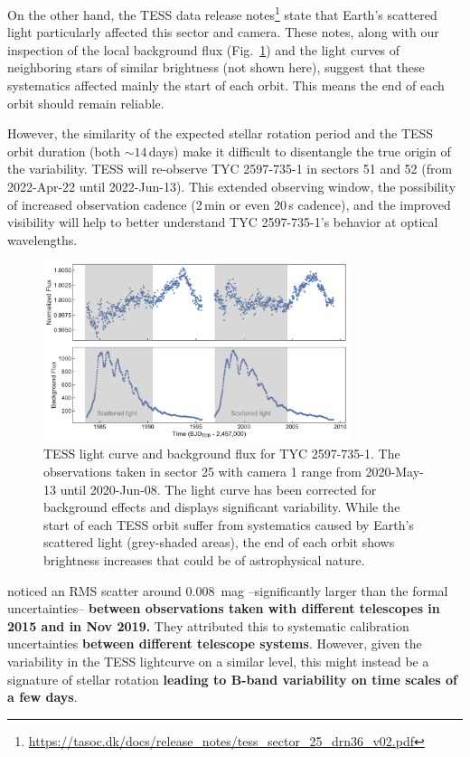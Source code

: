\documentclass[linenumbers]{aastex631}
\begin{document}
On the other hand, the TESS data release notes\footnote{\url{https://tasoc.dk/docs/release_notes/tess_sector_25_drn36_v02.pdf}} state that Earth's scattered light particularly affected this sector and camera. These notes, along with our inspection of the local background flux (Fig.~\ref{fig:TESS_light_curve}) and the light curves of neighboring stars of similar brightness (not shown here), suggest that these systematics affected mainly the start of each orbit. This means the end of each orbit should remain reliable.

However, the similarity of the expected stellar rotation period and the TESS orbit duration (both $\sim14$\,days) make it difficult to disentangle the true origin of the variability. TESS will re-observe TYC 2597-735-1 in sectors 51 and 52 (from 2022-Apr-22 until 2022-Jun-13). This extended observing window, the possibility of increased observation cadence (2\,min or even 20\,s cadence), and the improved visibility will help to better understand TYC 2597-735-1's behavior at optical wavelengths.

\begin{figure}
    \centering
    \includegraphics[width=0.8\textwidth]{TESS_light_curve.pdf}
    \caption{TESS light curve and background flux for TYC 2597-735-1. The observations taken in sector 25 with camera 1 range from 2020-May-13 until 2020-Jun-08. The light curve has been corrected for background effects and displays significant variability. While the start of each TESS orbit suffer from systematics caused by Earth's scattered light (grey-shaded areas), the end of each orbit shows brightness increases that could be of astrophysical nature.
    \label{fig:TESS_light_curve}}
\end{figure}

\cite{2020Natur.587..387H} noticed an RMS scatter around 0.008~mag --significantly larger than the formal uncertainties-- 
\textbf{between observations taken with different telescopes in 2015 and in Nov 2019.}
They attributed this to systematic calibration uncertainties \textbf{between different telescope systems}. However, given the variability in the TESS lightcurve on a similar level, this might instead be a signature of stellar rotation \textbf{leading to B-band variability on time scales of a few days}.
\end{document}

